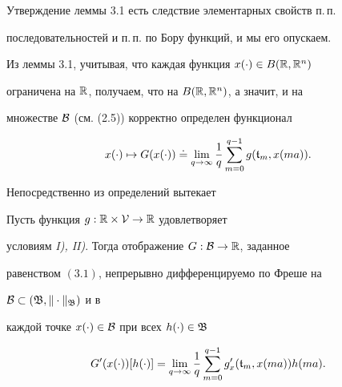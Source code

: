Утверждение леммы 3.1 есть следствие элементарных свойств п.\,п.


последовательностей и п.\,п. по Бору функций, и мы его опускаем.





Из леммы 3.1, учитывая, что каждая функция $x(\cdot)\in B(\Bbb R,\Bbb R^n)$


ограничена на $\Bbb R$, получаем, что на $B(\Bbb R,\Bbb R^n)$, а значит, и на


множестве $\cal B$ (см. (2.5)) корректно определен функционал


\begin{equation}


x(\cdot)\mapsto G(x(\cdot))\doteq \lim_{q\to\infty}


\frac{1}{q}\sum_{m=0}^{q-1}g(\frak t_m,x(ma)).


\end{equation}





Непосредственно из определений вытекает





\begin{lems}


Пусть функция $g:\Bbb R\times\cal V\to\Bbb R$ удовлетворяет


условиям {\em I), II)}. Тогда отображение $G:\cal B\to\Bbb R$, заданное


равенством $(3.1)$, непрерывно дифференцируемо по Фреше на


$\cal B\subset(\frak B,\|\cdot\|_{\frak B})$ и в


каждой точке $x(\cdot)\in\cal B$ при всех $h(\cdot)\in\frak B$


\begin{equation}


G'(x(\cdot))[h(\cdot)]=\lim_{q\to\infty}\frac{1}{q}\sum_{m=0}^{q-1}


g'_{x}(\frak t_m,x(ma))h(ma).


\end{equation}


\end{lems}





